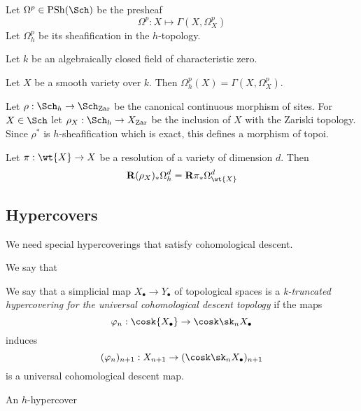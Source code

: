 \documentclass[12pt]{article}
\begin{document}
\newcommand{\Zar}{\mathrm{Zar}}

\begin{defn}
Let $\Omega^p \in \PSh(\Sch)$ be the presheaf
\[ \Omega^p : X \mapsto \Gamma(X, \Omega^p_X) \]
Let $\Omega^p_h$ be its sheafification in the $h$-topology.
\end{defn}

Let $k$ be an algebraically closed field of characteristic zero.

\begin{prop}[AJ Thm. 3.6]
Let $X$ be a smooth variety over $k$. Then $\Omega_h^p(X) = \Gamma(X, \Omega^p_X)$. 
\end{prop}

\begin{defn}
Let $\rho : \Sch_h \to \Sch_{\Zar}$ be the canonical continuous morphism of sites. For $X \in \Sch$ let $\rho_X : \Sch_h \to X_{\Zar}$ be the inclusion of $X$ with the Zariski topology. Since $\rho^*$ is $h$-sheafification which is exact, this defines a morphism of topoi. 
\end{defn}

\begin{prop}[Prop 6.19]
Let $\pi : \wt{X} \to X$ be a resolution of a variety of dimension $d$. Then 
\[ \R (\rho_X)_* \Omega^{d}_h = \R \pi_* \Omega_{\wt{X}}^d \]
\end{prop}

\subsection{Hypercovers}

We need special hypercoverings that satisfy cohomological descent. 

\begin{defn}
We say that 
\end{defn}

\begin{defn}[Delgine]
We say that a simplicial map $X_\bullet \to Y_\bullet$ of topological spaces is a \textit{k-truncated hypercovering for the universal cohomological descent topology} if the maps 
\[ \varphi_n : \cosk{X_\bullet} \to \cosk \sk_n X_\bullet \]
induces
\[ (\varphi_n)_{n+1} : X_{n+1} \to (\cosk \sk_n X_\bullet)_{n+1} \]
is a universal cohomological descent map. 
\end{defn}

\begin{defn}
An $h$-hypercover  



\end{defn}
\end{document}
